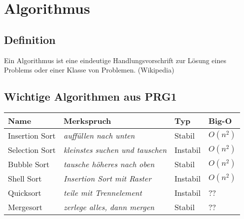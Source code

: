 



\newpage
\section{Algorithmus}

\subsection{Definition}
Ein Algorithmus ist eine eindeutige Handlungsvorschrift zur Lösung eines Problems oder einer Klasse von Problemen. (Wikipedia)

\subsection{Wichtige Algorithmen aus PRG1}

\begin{table}[h!]
	\centering
	\begin{tabular}{llll}
		\textbf{Name} 
			& \textbf{Merkspruch} 
			& \textbf{Typ} 
			& \textbf{Big-O} \\
		\hline
		Insertion Sort
			& \textit{auffüllen nach unten}
			& Stabil
			& $O(n^2)$ \\
		Selection Sort
			& \textit{kleinstes suchen und tauschen}
			& Instabil
			& $O(n^2)$ \\
		Bubble Sort
			& \textit{tausche höheres nach oben}
			& Stabil
			& $O(n^2)$ \\
		Shell Sort
			& \textit{Insertion Sort mit Raster}
			& Instabil
			& $O(n^2)$ \\
		Quicksort
			& \textit{teile mit Trennelement}
			& Instabil
			& ?? \\
		Mergesort
			& \textit{zerlege alles, dann mergen}
			& Stabil
			& ??
	\end{tabular}
\end{table}
